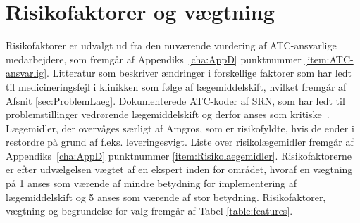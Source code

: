 






\section{Risikofaktorer og vægtning}
Risikofaktorer er udvalgt ud fra den nuværende vurdering af ATC-ansvarlige medarbejdere, som fremgår af Appendiks~\ref{cha:AppD} punktnummer \ref{item:ATC-ansvarlig}. Litteratur som beskriver ændringer i forskellige faktorer som har ledt til medicineringsfejl i klinikken som følge af lægemiddelskift, hvilket fremgår af Afsnit \ref{sec:ProblemLaeg}. Dokumenterede ATC-koder af SRN, som har ledt til problemstillinger vedrørende lægemiddelskift og derfor anses som kritiske~\citep{SRN}. Lægemidler, der overvåges særligt af Amgros, som er risikofyldte, hvis de ender i restordre på grund af f.eks. leveringesvigt. Liste over risikolægemidler fremgår af Appendiks~\ref{cha:AppD} punktnummer \ref{item:Risikolaegemidler}. Risikofaktorerne er efter udvælgelsen vægtet af en ekspert inden for området, hvoraf en vægtning på 1 anses som værende af mindre betydning for implementering af lægemiddelskift og 5 anses som værende af stor betydning. Risikofaktorer, vægtning og begrundelse for valg fremgår af Tabel \ref{table:features}.

